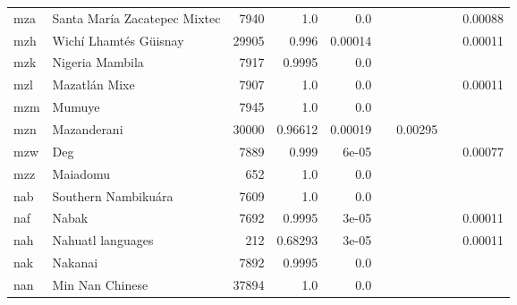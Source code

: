 \documentclass[11pt]{article}
\begin{document}
\begin{table*}[h]
{\begin{tabular}{llrrrrrrr}
mza         & Santa María Zacatepec Mixtec         & 7940         & 1.0         & 0.0         &          &          &          & 0.00088         \\

mzh         & Wichí Lhamtés Güisnay         & 29905         & 0.996         & 0.00014         &          &          &          & 0.00011         \\

mzk         & Nigeria Mambila         & 7917         & 0.9995         & 0.0         &          &          &          &          \\

mzl         & Mazatlán Mixe         & 7907         & 1.0         & 0.0         &          &          &          & 0.00011         \\

mzm         & Mumuye         & 7945         & 1.0         & 0.0         &          &          &          &          \\

mzn         & Mazanderani         & 30000         & 0.96612         & 0.00019         &          & 0.00295         &          &          \\

mzw         & Deg         & 7889         & 0.999         & 6e-05         &          &          &          & 0.00077         \\

mzz         & Maiadomu         & 652         & 1.0         & 0.0         &          &          &          &          \\

nab         & Southern Nambikuára         & 7609         & 1.0         & 0.0         &          &          &          &          \\

naf         & Nabak         & 7692         & 0.9995         & 3e-05         &          &          &          & 0.00011         \\

nah         & Nahuatl languages         & 212         & 0.68293         & 3e-05         &          &          &          & 0.00011         \\

nak         & Nakanai         & 7892         & 0.9995         & 0.0         &          &          &          &          \\

nan         & Min Nan Chinese         & 37894         & 1.0         & 0.0         &          &          &          &          \\


\end{tabular}}
\end{table*}
\end{document}
